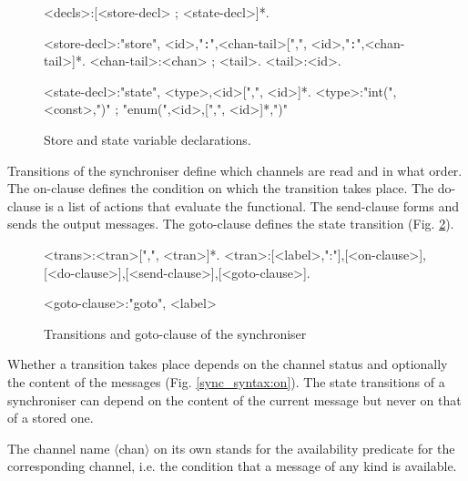 \begin{figure}[h!]
\small
\begin{grammar}
<decls>:[<store-decl> ; <state-decl>]*.

<store-decl>:"store", <id>,"{\tt :}",<chan-tail>[",", <id>,"{\tt :}",<chan-tail>]*.
<chan-tail>:<chan> ; <tail>.
<tail>:<id>.

<state-decl>:"state", <type>,<id>[",", <id>]*.
<type>:"int(",<const>,")" ; "enum(",<id>,[",", <id>]*,")"
\end{grammar}
\caption{Store and state variable declarations.}
\label{sync_syntax:decls}
\end{figure}

Transitions of the synchroniser define which channels are read and in what order. The on-clause defines the condition on which the transition takes place. The do-clause is a list of actions that evaluate the functional. The send-clause forms and sends the output messages. The goto-clause defines the state transition (Fig. \ref{sync_syntax:trans}).

\begin{figure}[h!]
\small
\begin{grammar}
<trans>:<tran>[",", <tran>]*.
<tran>:[<label>,":"],[<on-clause>],[<do-clause>],[<send-clause>],[<goto-clause>].

<goto-clause>:"goto", <label>
\end{grammar}
\caption{Transitions and goto-clause of the synchroniser}
\label{sync_syntax:trans}
\end{figure}

Whether a transition takes place depends on the channel status and optionally the content of the messages (Fig. \ref{sync_syntax:on}). The state transitions of a synchroniser can depend on the content of the current message but never on that of a stored one.

The channel name $\langle$chan$\rangle$ on its own stands for the availability predicate for the corresponding channel, i.e. the condition that a message of any kind is available.

